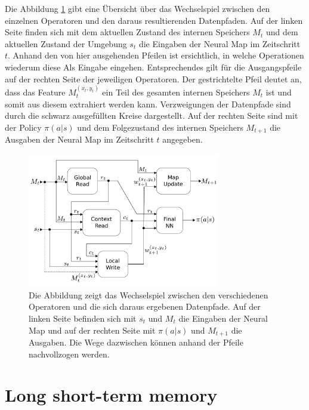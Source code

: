 Die Abbildung \ref{fig_neural_map} gibt eine Übersicht über das Wechselspiel zwischen den einzelnen Operatoren und den daraus resultierenden Datenpfaden. Auf der linken Seite finden sich mit dem aktuellen Zustand des internen Speichers $M_t$ und dem aktuellen Zustand der Umgebung $s_t$ die Eingaben der Neural Map im Zeitschritt $t$. Anhand den von hier ausgehenden Pfeilen ist ersichtlich, in welche Operationen wiederum diese Als Eingabe eingehen. Entsprechendes gilt für die Ausgangspfeile auf der rechten Seite der jeweiligen Operatoren. Der gestrichtelte Pfeil deutet an, dass das Feature $M_t^{(x_t,y_t)}$ ein Teil des gesamten internen Speichers $M_t$ ist und somit aus diesem extrahiert werden kann. Verzweigungen der Datenpfade sind durch die schwarz ausgefüllten Kreise dargestellt. Auf der rechten Seite sind mit der Policy $\pi(a|s)$ und dem Folgezustand des internen Speichers $M_{t+1}$ die Ausgaben der Neural Map im Zeitschritt $t$ angegeben.


\begin{figure}[ht!]
  \centering
  \includegraphics[keepaspectratio,width=0.75\textwidth]{abbildungen/neural_map.pdf}
  \caption{Die Abbildung zeigt das Wechselspiel zwischen den verschiedenen Operatoren und die sich daraus ergebenen Datenpfade. Auf der linken Seite befinden sich mit $s_t$ und $M_t$ die Eingaben der Neural Map und auf der rechten Seite mit $\pi(a|s)$ und $M_{t+1}$ die Ausgaben. Die Wege dazwischen können anhand der Pfeile nachvollzogen werden.}
  \label{fig_neural_map}
\end{figure}


\section{Long short-term memory}
\label{sec_lstm}


